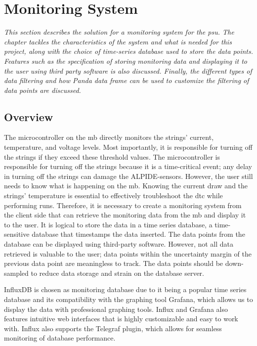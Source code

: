 \documentclass[main.tex]{subfiles}
\begin{document}
\section{Monitoring System}
\label{section: monitoring}
\textit{This section describes the solution for a monitoring system for the \gls{psu}. The chapter tackles the characteristics of the system and what is needed for this project, along with the choice of time-series database used to store the data points. Features such as the specification of storing monitoring data and displaying it to the user using third party software is also discussed. Finally, the different types of data filtering and how Panda data frame can be used to customize the filtering of data points are discussed.}

\subsection{Overview}

The microcontroller on the \gls{mb} directly monitors the strings' current, temperature, and voltage levels. Most importantly, it is responsible for turning off the strings if they exceed these threshold values. The microcontroller is responsible for turning off the strings because it is a time-critical event; any delay in turning off the strings can damage the ALPIDE-sensors. However, the user still needs to know what is happening on the \gls{mb}. Knowing the current draw and the strings' temperature is essential to effectively troubleshoot the \gls{dtc} while performing runs. Therefore, it is necessary to create a monitoring system from the client side that can retrieve the monitoring data from the \gls{mb} and display it to the user. It is logical to store the data in a time series database, a time-sensitive database that timestamps the data inserted. The data points from the database can be displayed using third-party software. However, not all data retrieved is valuable to the user; data points within the uncertainty margin of the previous data point are meaningless to track. The data points should be down-sampled to reduce data storage and strain on the database server.

 InfluxDB is chosen as monitoring database due to it being a popular time series database and its compatibility with the graphing tool Grafana, which allows us to display the data with professional graphing tools. Influx and Grafana also features intuitive web interfaces that is highly customizable and easy to work with. Influx also supports the Telegraf plugin, which allows for seamless monitoring of database performance. 
 
\end{document}
